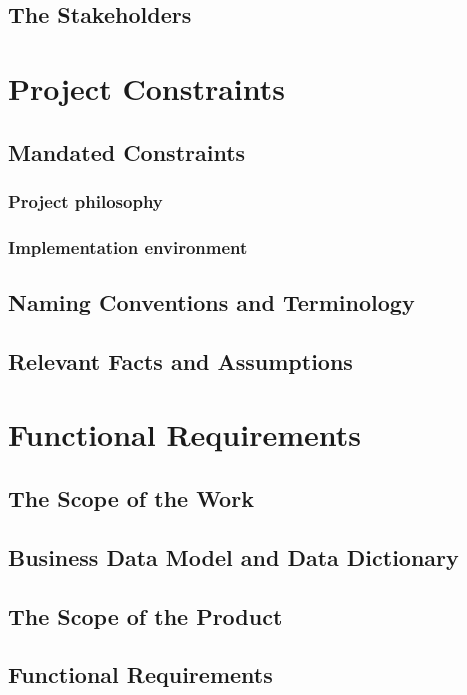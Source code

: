 \documentclass{article}
\begin{document}
\subsection{The Stakeholders}
\section{Project Constraints}

\subsection{Mandated Constraints}
\subsubsection{Project philosophy}
\subsubsection{Implementation environment}
\subsection{Naming Conventions and Terminology}
\subsection{Relevant Facts and Assumptions}

\section{Functional Requirements}

\subsection{The Scope of the Work}
\subsection{Business Data Model and Data Dictionary}
\subsection{The Scope of the Product}
\subsection{Functional Requirements}
\end{document}
